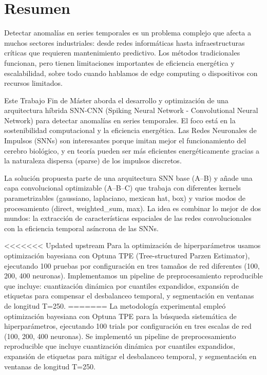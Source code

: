 \chapter*{Resumen}
\label{chap:resumen}


Detectar anomalías en series temporales es un problema complejo que afecta a muchos sectores industriales: desde redes informáticas hasta infraestructuras críticas que requieren mantenimiento predictivo. Los métodos tradicionales funcionan, pero tienen limitaciones importantes de eficiencia energética y escalabilidad, sobre todo cuando hablamos de edge computing o dispositivos con recursos limitados.

Este Trabajo Fin de Máster aborda el desarrollo y optimización de una arquitectura híbrida SNN-CNN (Spiking Neural Network - Convolutional Neural Network) para detectar anomalías en series temporales. El foco está en la sostenibilidad computacional y la eficiencia energética. Las Redes Neuronales de Impulsos (SNNs) son interesantes porque imitan mejor el funcionamiento del cerebro biológico, y en teoría pueden ser más eficientes energéticamente gracias a la naturaleza dispersa (sparse) de los impulsos discretos.

La solución propuesta parte de una arquitectura SNN base (A--B) y añade una capa convolucional optimizable (A--B--C) que trabaja con diferentes kernels parametrizables (gaussiano, laplaciano, mexican hat, box) y varios modos de procesamiento (direct, weighted\_sum, max). La idea es combinar lo mejor de dos mundos: la extracción de características espaciales de las redes convolucionales con la eficiencia temporal asíncrona de las SNNs.

<<<<<<< Updated upstream
Para la optimización de hiperparámetros usamos optimización bayesiana con Optuna TPE (Tree-structured Parzen Estimator), ejecutando 100 pruebas por configuración en tres tamaños de red diferentes (100, 200, 400 neuronas). Implementamos un pipeline de preprocesamiento reproducible que incluye: cuantización dinámica por cuantiles expandidos, expansión de etiquetas para compensar el desbalanceo temporal, y segmentación en ventanas de longitud T=250.
=======
La metodología experimental empleó optimización bayesiana con Optuna TPE para la búsqueda sistemática de hiperparámetros, ejecutando 100 trials por configuración en tres escalas de red (100, 200, 400 neuronas). Se implementó un pipeline de preprocesamiento reproducible que incluye cuantización dinámica por cuantiles expandidos, expansión de etiquetas para mitigar el desbalanceo temporal, y segmentación en ventanas de longitud T=250.

